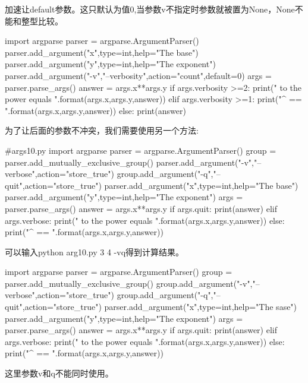 加速让default参数。这只默认为值0,当参数v不指定时参数就被置为None，None不能和整型比较。
\begin{python}
import argparse
parser = argparse.ArgumentParser()
parser.add_argument("x",type=int,help="The base")
parser.add_argument("y",type=int,help="The exponent")
parser.add_argument("-v","--verbosity",action="count",default=0)
args = parser.parse_args()
answer = args.x**args.y
if args.verbosity >=2:
    print("{} to the power {} equals {}".format(args.x,args.y,answer))
elif args.verbosity >=1:
    print("{}^{} == {}".format(args.x,args.y,answer))
else:
    print(answer)
\end{python}
为了让后面的参数不冲突，我们需要使用另一个方法:
\begin{python}
#args10.py
import argparse
parser = argparse.ArgumentParser()
group = parser.add_mutually_exclusive_group()
parser.add_argument("-v","--verbose",action="store_true")
group.add_argument("-q","--quit",action="store_true")
parser.add_argument("x",type=int,help="The base")
parser.add_argument("y",type=int,help="The exponent")
args = parser.parse_args()
answer = args.x**args.y
if args.quit:
    print(answer)
elif args.verbose:
    print("{} to the power {} equals {}".format(args.x,args.y,answer))
else:
    print("{}^{} == {}".format(args.x,args.y,answer))
\end{python}
可以输入python arg10.py 3 4 -vq得到计算结果。
\begin{python}
import argparse
parser = argparse.ArgumentParser()
group = parser.add_mutually_exclusive_group()
group.add_argument("-v","--verbose",action="store_true")
group.add_argument("-q","--quit",action="store_true")
parser.add_argument("x",type=int,help="The sase")
parser.add_argument("y",type=int,help="The exponent")
args = parser.parse_args()
answer = args.x**args.y
if args.quit:
    print(answer)
elif args.verbose:
    print("{} to the power {} equals {}".format(args.x,args.y,answer))
else:
    print("{}^{} == {}".format(args.x,args.y,answer))
\end{python}
这里参数v和q不能同时使用。

